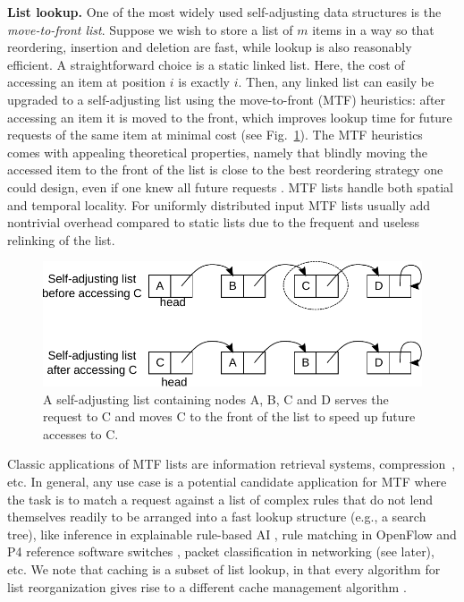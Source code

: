 \noindent%
\textbf{List lookup.} %
One of the most widely used self-adjusting data structures is the \emph{move-to-front list}. Suppose we wish to store a list of $m$ items in a way so that reordering, insertion and deletion are fast, while lookup is also reasonably efficient. A straightforward choice is a static linked list. Here, the cost of accessing an item at position $i$ is exactly $i$. Then, any linked list can easily be upgraded to a self-adjusting list using the move-to-front (MTF) heuristics: after accessing an item it is moved to the front, which improves lookup time for future requests of the same item at minimal cost (see Fig.~\ref{fig:mtf-example}). The MTF heuristics comes with appealing theoretical properties, namely that blindly moving the accessed item to the front of the list is close to the best reordering strategy one could design, even if one knew all future requests \cite{SleatorT85}. MTF lists handle both spatial and temporal locality. For uniformly distributed input MTF lists usually add nontrivial overhead compared to static lists due to the frequent and useless relinking of the list.

\begin{figure}
  \centering
  \includegraphics[width=.75\linewidth]{fig/mtf.pdf}
  \caption{A self-adjusting list containing nodes A, B, C and D serves the request to C and moves C to the front of the list to speed up future accesses to C.}
  \label{fig:mtf-example}
\end{figure}

Classic applications of MTF lists are information retrieval systems, compression~\cite{BentleySTW86}, etc. In general, any use case is a potential candidate application for MTF where the task is to match a request against a list of complex rules that do not lend themselves readily to be arranged into a fast lookup structure (e.g., a search tree), like inference in explainable rule-based AI %
\cite{dovsilovic2018explainable}, rule matching in OpenFlow and P4 reference software switches \cite{openflow}, packet classification in networking (see later), etc.  We note that caching is a subset of list lookup, in that every algorithm for list reorganization gives rise to a different cache management algorithm \cite{SleatorT85}.  

